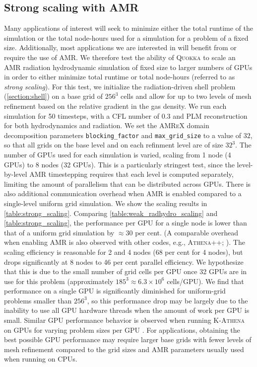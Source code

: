 \documentclass[fleqn,usenatbib]{mnras}
\begin{document}
\subsection{Strong scaling with AMR}
Many applications of interest will seek to minimize either the total runtime of the simulation or the total node-hours used for a simulation for a problem of a fixed size. Additionally, most applications we are interested in will benefit from or require the use of AMR.  We therefore test the ability of \textsc{Quokka} to scale an AMR radiation hydrodynamic simulation of fixed size to larger numbers of GPUs in order to either minimize total runtime or total node-hours (referred to as \emph{strong scaling}). For this test, we initialize the radiation-driven shell problem (\autoref{section:shell}) on a base grid of $256^3$ cells and allow for up to two levels of mesh refinement based on the relative gradient in the gas density. We run each simulation for 50 timesteps, with a CFL number of $0.3$ and PLM reconstruction for both hydrodynamics and radiation. We set the \textsc{AMReX} domain decomposition parameters \texttt{blocking\_factor} and \texttt{max\_grid\_size} to a value of $32$, so that all grids on the base level and on each refinment level are of size $32^3$. The number of GPUs used for each simulation is varied, scaling from 1 node (4 GPUs) to 8 nodes (32 GPUs). This is a particularly stringest test, since the level-by-level AMR timestepping requires that each level is computed separately, limiting the amount of parallelism that can be distributed across GPUs. There is also additional communication overhead when AMR is enabled compared to a single-level uniform grid simulation. We show the scaling results in \autoref{table:strong_scaling}. Comparing \autoref{table:weak_radhydro_scaling} and \autoref{table:strong_scaling}, the performance per GPU for a single node is lower than that of a uniform grid simulation by $\approx 30$ per cent. (A comparable overhead when enabling AMR is also observed with other codes, e.g., \textsc{Athena++}; \citealt{Stone_2020}). The scaling efficiency is reasonable for 2 and 4 nodes (68 per cent for 4 nodes), but drops significantly at 8 nodes to 46 per cent parallel efficiency. We hypothesize that this is due to the small number of grid cells per GPU once 32 GPUs are in use for this problem (approximately $185^3 \approx 6.3 \times 10^6$ cells/GPU). We find that performance on a single GPU is significantly diminished for uniform-grid problems smaller than $256^3$, so this performance drop may be largely due to the inability to use all GPU hardware threads when the amount of work per GPU is small. Similar GPU performance behavior is observed when running \textsc{K-Athena} on GPUs for varying problem sizes per GPU \citep{Grete_2019}. For applications, obtaining the best possible GPU performance may require larger base grids with fewer levels of mesh refinement compared to the grid sizes and AMR parameters usually used when running on CPUs.
\end{document}
